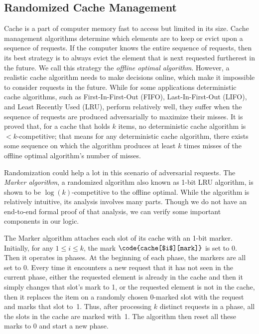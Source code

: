 \subsection{Randomized Cache Management}
  

Cache is a part of computer memory fast to access but limited in its size.
Cache management algorithms determine which elements are to keep or
evict upon a sequence of requests.
If the computer knows the entire sequence of requests, then its best strategy is
to always evict the element that is next requested furtherest in the future.
We call this strategy the \emph{offline optimal algorithm}.
However, a realistic cache algorithm needs to make decisions
online, which make it impossible to consider requests in the future.
While for some applications deterministic
cache algorithms, such as First-In-First-Out (FIFO), Last-In-First-Out (LIFO),
and Least Recently Used (LRU), perform relatively well, they suffer when the
sequence of requests are produced adversarially to maximize their misses. It is
proved that, for a cache that holds $k$ items, no deterministic cache algorithm
is $< k$-competitive; that means for any deterministic cache algorithm, there
exists some sequence on which the algorithm produces at least $k$ times misses
of the offline optimal algorithm's number of misses.

Randomization could help a lot in this scenario of adversarial requests.
The \emph{Marker algorithm}, a randomized algorithm also known as 1-bit LRU algorithm,
is shown to be $\log(k)$-competitive to the offline optimal.
While the algorithm is relatively intuitive, its analysis involves many parts.
Though we do not have an end-to-end formal proof of that analysis,
we can verify some important components in our logic.

The Marker algorithm attaches each slot of its cache with an 1-bit marker.
Initially, for any $1 \leq i \leq k$, the mark
$\code{cache[$i$][mark]}$ is set to 0.
Then it operates in phases.
At the beginning of each phase, the markers are all set to 0.
Every time it encounters a new request that
it has not seen in the current phase,
either the requested element is already in the cache and then
it simply changes that slot's mark to 1,
or the requested element is not in the cache,
then it replaces the item on a randomly chosen 0-marked slot with the request
and marks that slot to~1.
Thus, after processing $k$ distinct requests in a phase,
all the slots in the cache are marked with~1.
 The algorithm then reset all
these marks to 0 and start a new phase.

